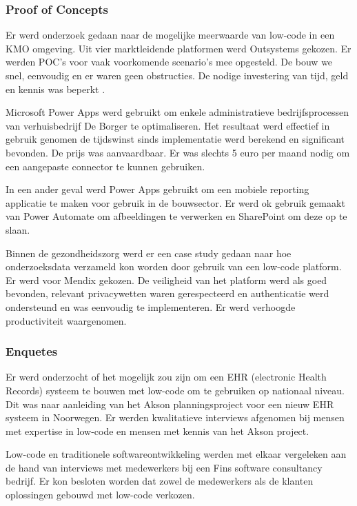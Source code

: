 \subsubsection{Proof of Concepts}

Er werd onderzoek gedaan naar de mogelijke meerwaarde van low-code in een KMO omgeving. Uit vier marktleidende platformen werd Outsystems gekozen. Er werden POC's voor vaak voorkomende scenario's mee opgesteld. De bouw we snel, eenvoudig en er waren geen obstructies. De nodige investering van tijd, geld en kennis was beperkt \autocite{Devloo2018}.

Microsoft Power Apps werd gebruikt om enkele administratieve bedrijfsprocessen van verhuisbedrijf De Borger te optimaliseren. Het resultaat werd effectief in gebruik genomen de tijdswinst sinds implementatie werd berekend en significant bevonden. De prijs was aanvaardbaar. Er was slechts 5 euro per maand nodig om een aangepaste connector te kunnen gebruiken. \autocite{Spriet2019}

In een ander geval werd Power Apps gebruikt om een mobiele reporting applicatie te maken voor gebruik in de bouwsector. Er werd ok gebruik gemaakt van Power Automate om afbeeldingen te verwerken en SharePoint om deze op te slaan. \autocite{Aho2018}

Binnen de gezondheidszorg werd er een case study gedaan naar hoe onderzoeksdata verzameld kon worden door gebruik van een low-code platform. Er werd voor Mendix gekozen. De veiligheid van het platform werd als goed bevonden, relevant privacywetten waren gerespecteerd en authenticatie werd ondersteund en was eenvoudig te implementeren. Er werd verhoogde productiviteit waargenomen. \autocite{Totterdale2018}

\subsubsection{Enquetes}

Er werd onderzocht of het mogelijk zou zijn om een EHR (electronic Health Records) systeem te bouwen met low-code om te gebruiken op nationaal niveau. Dit was naar aanleiding van het Akson planningsproject voor een nieuw EHR systeem in Noorwegen. Er werden kwalitatieve interviews afgenomen bij mensen met expertise in low-code en mensen met kennis van het Akson project. \autocite{Ness2019}

Low-code en traditionele softwareontwikkeling werden met elkaar vergeleken aan de hand van interviews met medewerkers bij een Fins software consultancy bedrijf. Er kon besloten worden dat zowel de medewerkers als de klanten oplossingen gebouwd met low-code verkozen. \autocite{Virta2018}

